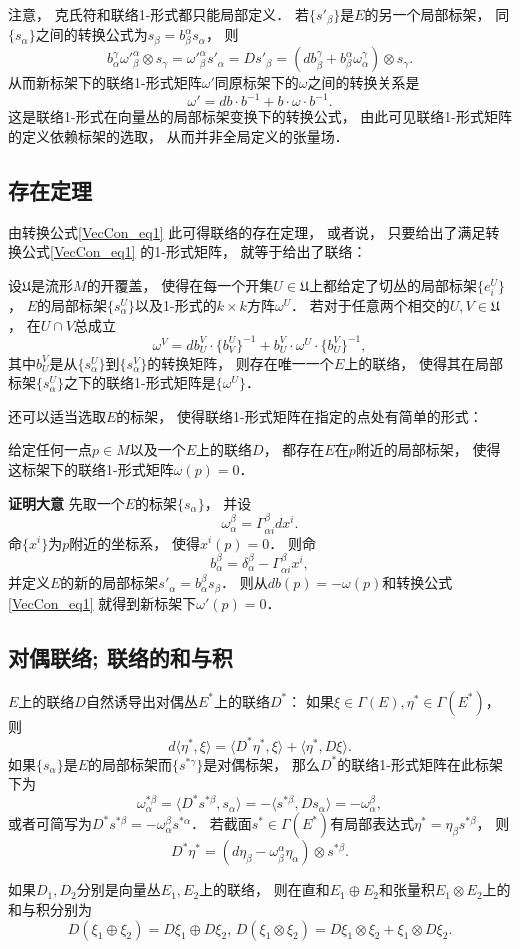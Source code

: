 注意， 克氏符和联络1-形式都只能局部定义． 若$\{s'_\beta\}$是$E$的另一个局部标架， 同$\{s_\alpha\}$之间的转换公式为$s_\beta=b_\beta^\alpha s_\alpha$， 则
$$
b_\alpha^\gamma{\omega'}_{\beta}^{\alpha}\otimes s_\gamma={\omega'}_{\beta}^{\alpha}s'_\alpha=Ds'_\beta=(db_\beta^\gamma+b_\beta^\alpha\omega_\alpha^\gamma)\otimes s_\gamma.
$$
从而新标架下的联络1-形式矩阵$\omega'$同原标架下的$\omega$之间的转换关系是
\begin{equation}\label{VecCon_eq1}
\omega'=db\cdot b^{-1}+b\cdot\omega\cdot b^{-1}.
\end{equation}
这是联络1-形式在向量丛的局部标架变换下的转换公式， 由此可见联络1-形式矩阵的定义依赖标架的选取， 从而并非全局定义的张量场．

\subsection{存在定理}
由转换公式\autoref{VecCon_eq1} 此可得联络的存在定理， 或者说， 只要给出了满足转换公式\autoref{VecCon_eq1} 的1-形式矩阵， 就等于给出了联络：
\begin{theorem}{}
设$\mathfrak{U}$是流形$M$的开覆盖， 使得在每一个开集$U\in\mathfrak{U}$上都给定了切丛的局部标架$\{e^U_i\}$， $E$的局部标架$\{s^U_\alpha\}$以及1-形式的$k\times k$方阵$\omega^U$． 若对于任意两个相交的$U,V\in\mathfrak{U}$， 在$U\cap V$总成立
$$
\omega^V=db^V_U\cdot \{b_V^U\}^{-1}+b^V_U\cdot\omega^U\cdot \{b^V_U\}^{-1},
$$
其中$b^V_U$是从$\{s^U_\alpha\}$到$\{s^V_\alpha\}$的转换矩阵， 则存在唯一一个$E$上的联络， 使得其在局部标架$\{s^U_\alpha\}$之下的联络1-形式矩阵是$\{\omega^U\}$．
\end{theorem}

还可以适当选取$E$的标架， 使得联络1-形式矩阵在指定的点处有简单的形式：
\begin{theorem}{}
给定任何一点$p\in M$以及一个$E$上的联络$D$， 都存在$E$在$p$附近的局部标架， 使得这标架下的联络1-形式矩阵$\omega(p)=0$．
\end{theorem}
\textbf{证明大意} 先取一个$E$的标架$\{s_\alpha\}$， 并设
$$
\omega^\beta_\alpha=\Gamma_{\alpha i}^\beta dx^i.
$$
命$\{x^i\}$为$p$附近的坐标系， 使得$x^i(p)=0$． 则命
$$
b_\alpha^\beta=\delta_\alpha^\beta-\Gamma_{\alpha i}^\beta x^i,
$$
并定义$E$的新的局部标架$s'_\alpha=b_\alpha^\beta s_\beta$． 则从$db(p)=-\omega(p)$和转换公式\autoref{VecCon_eq1} 就得到新标架下$\omega'(p)=0$．

\subsection{对偶联络; 联络的和与积}
$E$上的联络$D$自然诱导出对偶丛$E^*$上的联络$D^*$： 如果$\xi\in\Gamma(E),\eta^*\in\Gamma(E^*)$， 则
$$
d\langle \eta^*,\xi\rangle=\langle D^*\eta^*,\xi\rangle+\langle \eta^*,D\xi\rangle.
$$
如果$\{s_\alpha\}$是$E$的局部标架而$\{s^{*\gamma}\}$是对偶标架， 那么$D^*$的联络1-形式矩阵在此标架下为
$$
\omega^{*\beta}_\alpha
=\langle D^*s^{*\beta},s_\alpha\rangle
=-\langle s^{*\beta},Ds_\alpha\rangle
=-\omega^\beta_\alpha,
$$
或者可简写为$D^*s^{*\beta}=-\omega^\beta_\alpha s^{*\alpha}$． 若截面$s^*\in\Gamma(E^*)$有局部表达式$\eta^*=\eta_\beta s^{*\beta}$， 则
$$
D^*\eta^*=(d\eta_\beta-\omega_\beta^\alpha\eta_\alpha)\otimes s^{*\beta}.
$$

如果$D_1,D_2$分别是向量丛$E_1,E_2$上的联络， 则在直和$E_1\oplus E_2$和张量积$E_1\otimes E_2$上的和与积分别为
$$
D(\xi_1\oplus \xi_2)=D\xi_1\oplus D\xi_2,
\,
D(\xi_1\otimes \xi_2)=D\xi_1\otimes \xi_2+\xi_1\otimes D\xi_2.
$$